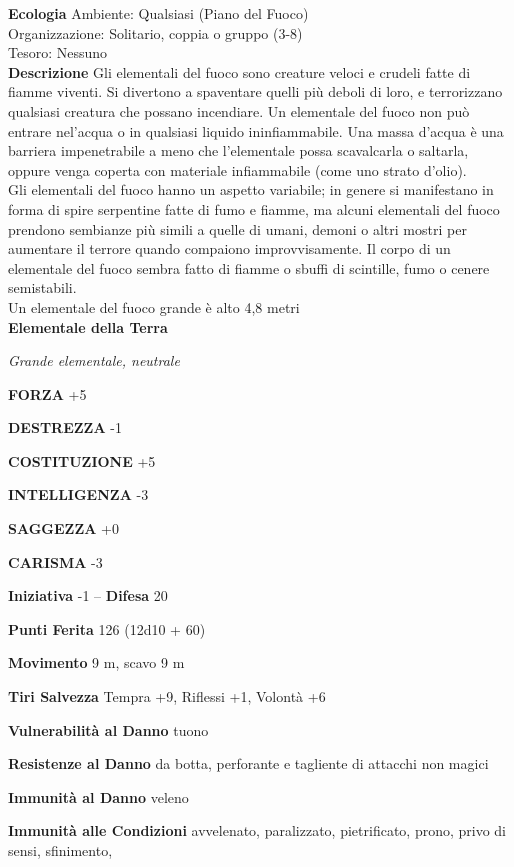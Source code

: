\begin{multicols}{2}
\textbf{Ecologia}
Ambiente: Qualsiasi (Piano del Fuoco)\\
Organizzazione: Solitario, coppia o gruppo (3-8)\\
Tesoro: Nessuno\\
\textbf{Descrizione}
Gli elementali del fuoco sono creature veloci e crudeli fatte di fiamme viventi. Si divertono a spaventare quelli più deboli di loro, e terrorizzano qualsiasi creatura che possano incendiare. Un elementale del fuoco non può entrare nel'acqua o in qualsiasi liquido ininfiammabile. Una massa d'acqua è una barriera impenetrabile a meno che l'elementale possa scavalcarla o saltarla, oppure venga coperta con materiale infiammabile (come uno strato d'olio).\\
Gli elementali del fuoco hanno un aspetto variabile; in genere si manifestano in forma di spire serpentine fatte di fumo e fiamme, ma alcuni elementali del fuoco prendono sembianze più simili a quelle di umani, demoni o altri mostri per aumentare il terrore quando compaiono improvvisamente. Il corpo di un elementale del fuoco sembra fatto di fiamme o sbuffi di scintille, fumo o cenere semistabili.\\

Un elementale del fuoco grande è alto 4,8 metri\\

\medskip{}\textbf{Elementale della Terra}

\emph{Grande elementale, neutrale}

\textbf{FORZA} +5

\textbf{DESTREZZA} -1

\textbf{COSTITUZIONE} +5

\textbf{INTELLIGENZA} -3

\textbf{SAGGEZZA} +0

\textbf{CARISMA} -3

\textbf{Iniziativa} -1 -- \textbf{Difesa} 20

\textbf{Punti Ferita} 126 (12d10 + 60)

\textbf{Movimento} 9 m, scavo 9 m

\textbf{Tiri Salvezza} Tempra +9, Riflessi +1, Volontà +6

\textbf{Vulnerabilità al Danno} tuono

\textbf{Resistenze al Danno} da botta, perforante e tagliente di attacchi non magici

\textbf{Immunità al Danno} veleno

\textbf{Immunità alle Condizioni} avvelenato, paralizzato, pietrificato, prono, privo di sensi, sfinimento,


\end{multicols}
